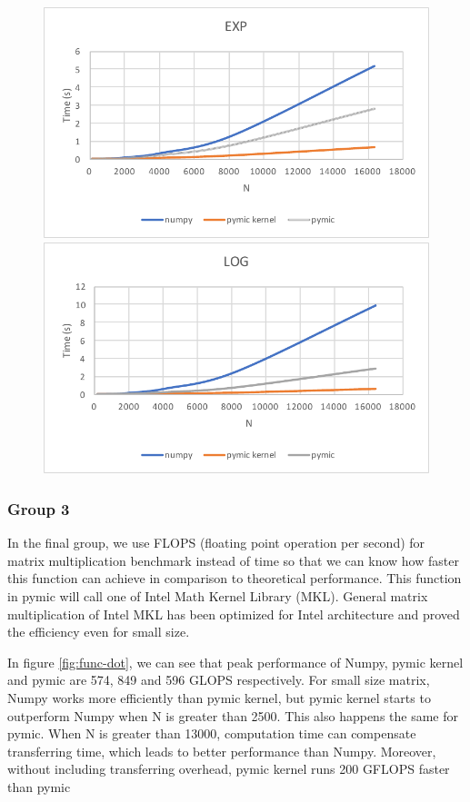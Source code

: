 \begin{figure}[]
\includegraphics[scale=0.5]{img/group2/exp.pdf}
\includegraphics[scale=0.5]{img/group2/log.pdf}
\end{figure}

\subsubsection{Group 3}
In the final group, we use FLOPS (floating point operation per second) for matrix multiplication benchmark instead of time so that we can know how faster this function can achieve in comparison to theoretical performance. This function in pymic will call one of Intel Math Kernel Library (MKL). General matrix multiplication of Intel MKL has been optimized for Intel architecture and proved the efficiency even for small size. 

In figure \ref{fig:func-dot}, we can see that peak performance of Numpy, pymic kernel and pymic are 574, 849 and 596 GLOPS respectively. For small size matrix, Numpy works more efficiently than pymic kernel, but pymic kernel starts to outperform Numpy when N is greater than 2500. This also happens the same for pymic. When N is greater than 13000, computation time can compensate transferring time, which leads to better performance than Numpy. Moreover, without including transferring overhead, pymic kernel runs 200 GFLOPS faster than pymic

